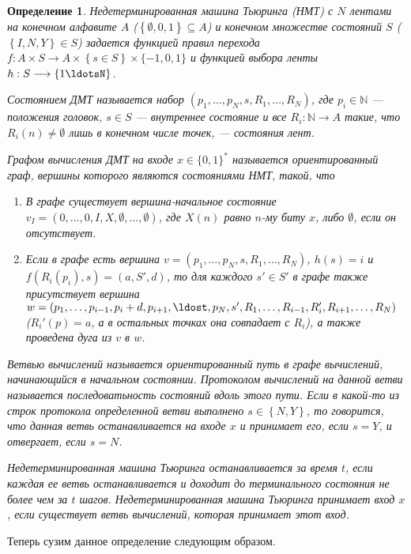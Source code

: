 \documentclass[14pt, a4paper]{extreport}
\newtheorem{definition}{\indent Определение}
\newcommand{\word}{\{0, 1\}^*}
\newcommand{\set}[1]{\left\{#1\right\}}
\begin{document}
\begin{definition}Недетерминированная машина Тьюринга (НМТ) с $N$ лентами на конечном алфавите $A$ ($\set{\emptyset, 0, 1} \subseteq A$) и конечном множестве состояний $S$ ($\set{I, N, Y} \in S$) задается функцией правил перехода $f: A \times S \longrightarrow A \times \set{s \in S} \times \{-1, 0, 1\}$ и функцией выбора ленты $h: S \longrightarrow \set{1\ldotsN}$.

Состоянием ДМТ называется набор $\left(p_1, \ldots, p_N, s, R_1, \ldots, R_N\right)$, где $p_i \in \mathbb{N}$ --- положения головок, $s \in S$ --- внутреннее состояние и все $R_i: \mathbb{N} \longrightarrow A$ такие, что $R_i(n) \neq \emptyset$ лишь в конечном числе точек, --- состояния лент.

Графом вычисления ДМТ на входе $x \in \word$ называется ориентированный граф, вершины которого являются состояниями НМТ, такой, что
\begin{enumerate}
    \item В графе существует вершина-начальное состояние $v_I = \left(0, \ldots, 0, I, X, \emptyset, \ldots, \emptyset\right)$, где $X(n)$ равно $n$-му биту $x$, либо $\emptyset$, если он отсутствует.
    \item Если в графе есть вершина $v = \left(p_1, \ldots, p_N, s, R_1, \ldots, R_N\right)$, $h(s) = i$ и $f(R_i(p_i), s) = (a, S', d)$, то для каждого $s' \in S'$ в графе также присутствует вершина $w = \left(p_1, \ldots, p_{i-1}, p_i + d, p_{i+1}, \ldost, p_N, s', R_1, \ldots, R_{i-1}, R'_i, R_{i+1}, \ldots, R_N\right)$ ($R_i'(p) = a$, а в остальных точках она совпадает с $R_i$), а также проведена дуга из $v$ в $w$.
\end{enumerate}

Ветвью вычислений называется ориентированный путь в графе вычислений, начинающийся в начальном состоянии. Протоколом вычислений на данной ветви называется последоватьность состояний вдоль этого пути.
Если в какой-то из строк протокола определенной ветви выполнено $s \in \set{N, Y}$, то говорится, что данная ветвь останавливается на входе $x$ и принимает его, если $s = Y$, и отвергает, если $s = N$. 

Недетерминированная машина Тьюринга останавливается за время $t$, если каждая ее ветвь останавливается и доходит до терминального состояния не более чем за $t$ шагов. 
Недетерминированная машина Тьюринга принимает вход $x$, если существует ветвь вычислений, которая принимает этот вход.
\end{definition}
Теперь сузим данное определение следующим образом.
\end{document}
